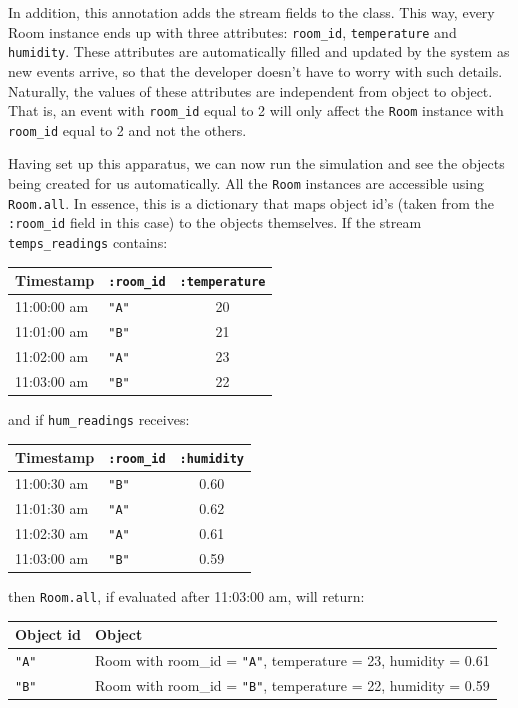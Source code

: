 \documentclass[a4,11pt]{report}
\begin{document}
In addition, this annotation adds the stream fields to the class. This
way, every Room instance ends up with three attributes:
\verb=room_id=, \verb=temperature= and \verb=humidity=. These
attributes are automatically filled and updated by the system as new
events arrive, so that the developer doesn't have to worry with such
details. Naturally, the values of these attributes are independent
from object to object. That is, an event with \verb=room_id= equal to
2 will only affect the \verb=Room= instance with \verb=room_id= equal
to 2 and not the others.

Having set up this apparatus, we can now run the simulation and see
the objects being created for us automatically. All the \verb=Room=
instances are accessible using \verb=Room.all=. In essence, this is a
dictionary that maps object id's (taken from the \verb=:room_id= field
in this case) to the objects themselves. If the stream
\verb=temps_readings= contains:

\begin{tabular}{ |l|l|c| }
  \hline
  Timestamp & \verb=:room_id= & \verb=:temperature= \\
  \hline
  11:00:00 am & \verb="A"= & 20 \\
  11:01:00 am & \verb="B"= & 21 \\
  11:02:00 am & \verb="A"= & 23 \\
  11:03:00 am & \verb="B"= & 22 \\
  \hline
\end{tabular}

and if \verb=hum_readings= receives:

\begin{tabular}{ |l|l|c| }
  \hline
  Timestamp & \verb=:room_id= & \verb=:humidity= \\
  \hline
  11:00:30 am & \verb="B"= & 0.60 \\
  11:01:30 am & \verb="A"= & 0.62 \\
  11:02:30 am & \verb="A"= & 0.61 \\
  11:03:00 am & \verb="B"= & 0.59 \\
  \hline
\end{tabular}

then \verb=Room.all=, if evaluated after 11:03:00 am, will return:

\begin{tabular}{ |l|l| }
  \hline
  Object id & Object \\
  \hline
  \verb="A"= & Room with room\_id = \verb="A"=, temperature = 23, humidity = 0.61 \\
  \verb="B"= & Room with room\_id = \verb="B"=, temperature = 22, humidity = 0.59 \\
  \hline
\end{tabular}
\end{document}
